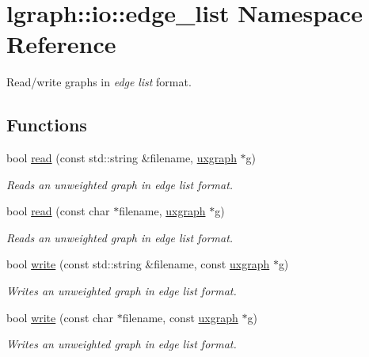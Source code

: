 \hypertarget{namespacelgraph_1_1io_1_1edge__list}{\section{lgraph\-:\-:io\-:\-:edge\-\_\-list Namespace Reference}
\label{namespacelgraph_1_1io_1_1edge__list}
}


Read/write graphs in {\itshape edge} {\itshape list} format.  


\subsection*{Functions}
\begin{DoxyCompactItemize}
\item 
bool \hyperlink{namespacelgraph_1_1io_1_1edge__list_a51d3431a6910ab3120f2d12efb7c2073}{read} (const std\-::string \&filename, \hyperlink{classlgraph_1_1uxgraph}{uxgraph} $\ast$g)
\begin{DoxyCompactList}\small\item\em Reads an unweighted graph in edge list format. \end{DoxyCompactList}\item 
bool \hyperlink{namespacelgraph_1_1io_1_1edge__list_a1861bd84b7b67c310fd1b13534b7308b}{read} (const char $\ast$filename, \hyperlink{classlgraph_1_1uxgraph}{uxgraph} $\ast$g)
\begin{DoxyCompactList}\small\item\em Reads an unweighted graph in edge list format. \end{DoxyCompactList}\item 
bool \hyperlink{namespacelgraph_1_1io_1_1edge__list_a769bbfbae588e800a54d5920ebf6f4d0}{write} (const std\-::string \&filename, const \hyperlink{classlgraph_1_1uxgraph}{uxgraph} $\ast$g)
\begin{DoxyCompactList}\small\item\em Writes an unweighted graph in edge list format. \end{DoxyCompactList}\item 
bool \hyperlink{namespacelgraph_1_1io_1_1edge__list_aed1aa537146bbb2f4f2308a04ec12ff6}{write} (const char $\ast$filename, const \hyperlink{classlgraph_1_1uxgraph}{uxgraph} $\ast$g)
\begin{DoxyCompactList}\small\item\em Writes an unweighted graph in edge list format. \end{DoxyCompactList}\item 

\end{DoxyCompactItemize}
